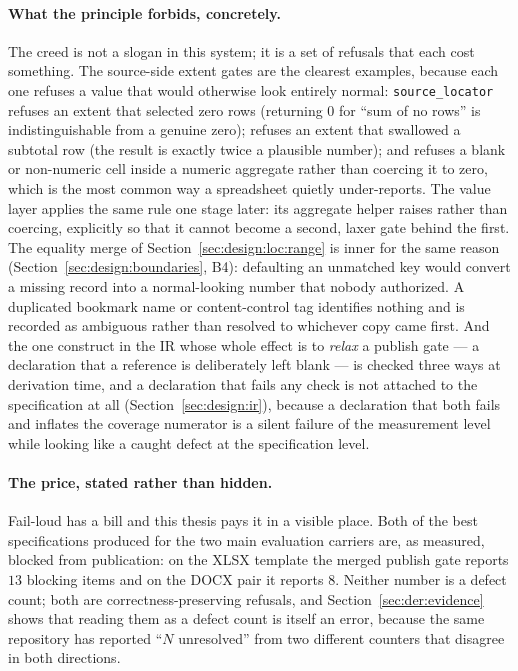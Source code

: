 \paragraph{What the principle forbids, concretely.}
The creed is not a slogan in this system; it is a set of refusals that each cost
something. The source-side extent gates are the clearest examples, because each one
refuses a value that would otherwise look entirely normal:
\texttt{source\_locator} refuses an extent that selected zero rows (returning $0$ for
``sum of no rows'' is indistinguishable from a genuine zero); refuses an extent that
swallowed a subtotal row (the result is exactly twice a plausible number); and refuses a
blank or non-numeric cell inside a numeric aggregate rather than coercing it to zero,
which is the most common way a spreadsheet quietly under-reports. The value layer applies
the same rule one stage later: its aggregate helper raises rather than coercing,
explicitly so that it cannot become a second, laxer gate behind the first. The equality
merge of Section~\ref{sec:design:loc:range} is inner for the same reason
(Section~\ref{sec:design:boundaries}, B4): defaulting an unmatched key would convert a
missing record into a normal-looking number that nobody authorized. A duplicated bookmark
name or content-control tag identifies nothing and is recorded as ambiguous rather than
resolved to whichever copy came first. And the one construct in the IR whose whole effect
is to \emph{relax} a publish gate --- a declaration that a reference is deliberately left
blank --- is checked three ways at derivation time, and a declaration that fails any check
is not attached to the specification at all
(Section~\ref{sec:design:ir}), because a declaration that both fails and inflates the
coverage numerator is a silent failure of the measurement level while looking like a
caught defect at the specification level.

\paragraph{The price, stated rather than hidden.}
Fail-loud has a bill and this thesis pays it in a visible place. Both of the best
specifications produced for the two main evaluation carriers are, as measured, blocked
from publication: on the XLSX template the merged publish gate reports $13$ blocking items
and on the DOCX pair it reports $8$. Neither number is a defect count; both are
correctness-preserving refusals, and Section~\ref{sec:der:evidence} shows that reading
them as a defect count is itself an error, because the same repository has reported
``$N$ unresolved'' from two different counters that disagree in both directions.

